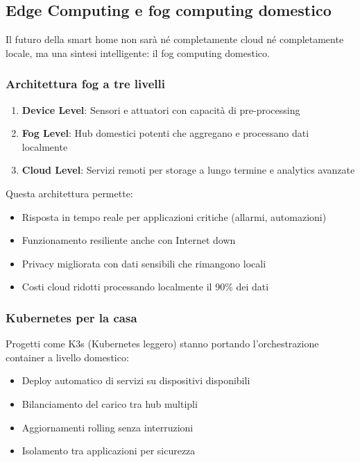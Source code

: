 \subsection{Edge Computing e fog computing domestico}

Il futuro della smart home non sarà né completamente cloud né completamente locale, ma una sintesi intelligente: il fog computing domestico.

\subsubsection{Architettura fog a tre livelli}

\begin{enumerate}
    \item \textbf{Device Level}: Sensori e attuatori con capacità di pre-processing
    \item \textbf{Fog Level}: Hub domestici potenti che aggregano e processano dati localmente
    \item \textbf{Cloud Level}: Servizi remoti per storage a lungo termine e analytics avanzate
\end{enumerate}

Questa architettura permette:
\begin{itemize}
    \item Risposta in tempo reale per applicazioni critiche (allarmi, automazioni)
    \item Funzionamento resiliente anche con Internet down
    \item Privacy migliorata con dati sensibili che rimangono locali
    \item Costi cloud ridotti processando localmente il 90\% dei dati
\end{itemize}

\subsubsection{Kubernetes per la casa}

Progetti come K3s (Kubernetes leggero) stanno portando l'orchestrazione container a livello domestico:

\begin{itemize}
    \item Deploy automatico di servizi su dispositivi disponibili
    \item Bilanciamento del carico tra hub multipli
    \item Aggiornamenti rolling senza interruzioni
    \item Isolamento tra applicazioni per sicurezza
\end{itemize}

